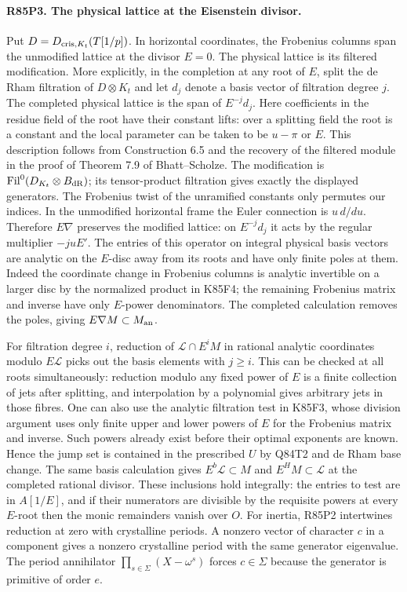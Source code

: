 \paragraph{R85P3. The physical lattice at the Eisenstein divisor.}
Put $D=D_{{\rm cris},K_t}(T[1/p])$. In horizontal coordinates,
the Frobenius columns span the unmodified lattice at the divisor
$E=0$. The physical lattice is its filtered modification. More
explicitly, in the completion at any root of $E$, split the
de Rham filtration of $D\otimes K_t$ and let $d_j$ denote a
basis vector of filtration degree $j$. The completed physical
lattice is the span of $E^{-j}d_j$. Here coefficients in the
residue field of the root have their constant lifts: over a
splitting field the root is a constant and the local parameter
can be taken to be $u-\pi$ or $E$. This description follows from
Construction 6.5 and the recovery of the filtered module in the
proof of Theorem 7.9 of Bhatt--Scholze. The modification is
$\mathrm{Fil}^0(D_{K_t}\otimes B_{\rm dR})$; its tensor-product
filtration gives exactly the displayed generators. The Frobenius
twist of the unramified constants only permutes our indices.
In the unmodified horizontal frame the Euler connection is
$u\,d/du$. Therefore $E\nabla$ preserves the modified lattice:
on $E^{-j}d_j$ it acts by the regular multiplier $-juE'$.
The entries of this operator on integral physical basis vectors
are analytic on the $E$-disc away from its roots and have only
finite poles at them. Indeed the coordinate change in Frobenius
columns is analytic invertible on a larger disc by the normalized
product in K85F4; the remaining Frobenius matrix and inverse
have only $E$-power denominators. The completed calculation
removes the poles, giving $E\nabla M\subset M_{\rm an}$.

For filtration degree $i$, reduction of $\mathcal L\cap E^iM$
in rational analytic coordinates modulo $E\mathcal L$ picks out
the basis elements with $j\ge i$. This can be checked at all
roots simultaneously: reduction modulo any fixed power of $E$
is a finite collection of jets after splitting, and interpolation
by a polynomial gives arbitrary jets in those fibres. One can
also use the analytic filtration test in K85F3, whose division
argument uses only finite upper and lower powers of $E$ for
the Frobenius matrix and inverse. Such powers already exist
before their optimal exponents are known. Hence the jump set is
contained in the prescribed $U$ by Q84T2 and de Rham base change.
The same basis calculation gives $E^b\mathcal L\subset M$ and
$E^HM\subset\mathcal L$ at the completed rational divisor.
These inclusions hold integrally: the entries to test are in
$A[1/E]$, and if their numerators are divisible by the requisite
powers at every $E$-root then the monic remainders vanish over
$O$. For inertia, R85P2 intertwines reduction at zero with
crystalline periods. A nonzero vector of character $c$ in a
component gives a nonzero crystalline period with the same
generator eigenvalue. The period annihilator
$\prod_{s\in\Sigma}(X-\omega^s)$ forces $c\in\Sigma$
because the generator is primitive of order $e$.


